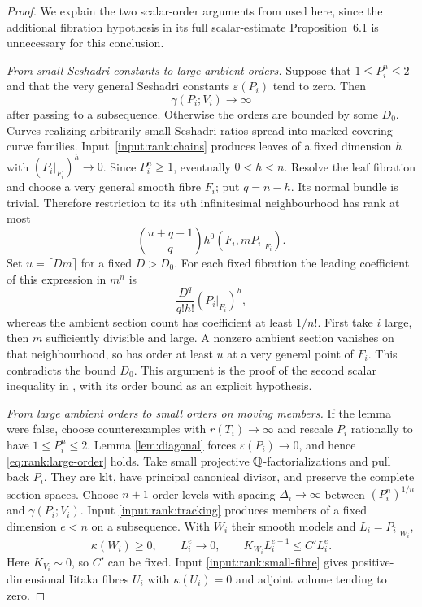 \begin{proof}
We explain the two scalar-order arguments from \cite{UPI} used here,
since the additional fibration hypothesis in its full scalar-estimate
Proposition~6.1 is unnecessary for this conclusion.

\emph{From small Seshadri constants to large ambient orders.}
Suppose that $1\le P_i^n\le2$ and that the very general Seshadri
constants $\varepsilon(P_i)$ tend to zero.  Then
\begin{equation}\label{eq:rank:large-order}
                         \gamma(P_i;V_i)\longrightarrow\infty
\end{equation}
after passing to a subsequence.  Otherwise the orders are bounded by
some $D_0$.  Curves realizing arbitrarily small Seshadri ratios spread
into marked covering curve families.  Input~\ref{input:rank:chains}
produces leaves of a fixed dimension $h$ with $(P_i|_{F_i})^h\to0$.
Since $P_i^n\ge1$, eventually $0<h<n$.  Resolve the leaf fibration and
choose a very general smooth fibre $F_i$; put $q=n-h$.  Its normal
bundle is trivial.  Therefore restriction to its $u$th infinitesimal
neighbourhood has rank at most
\[
                 \binom{u+q-1}{q}h^0(F_i,mP_i|_{F_i}).
\]
Set $u=\lceil Dm\rceil$ for a fixed $D>D_0$.  For each fixed
fibration the leading coefficient of this expression in $m^n$ is
\[
                   \frac{D^q}{q!h!}(P_i|_{F_i})^h,
\]
whereas the ambient section count has coefficient at least $1/n!$.
First take $i$ large, then $m$ sufficiently divisible and large.  A
nonzero ambient section vanishes on that neighbourhood, so has order
at least $u$ at a very general point of $F_i$.  This contradicts the
bound $D_0$.  This argument is the proof of the second scalar inequality
in \cite{UPI}, with its order bound as an explicit hypothesis.

\emph{From large ambient orders to small orders on moving members.}
If the lemma were false, choose counterexamples with $r(T_i)\to\infty$
and rescale $P_i$ rationally to have $1\le P_i^n\le2$.  Lemma
\ref{lem:diagonal} forces $\varepsilon(P_i)\to0$, and hence
\eqref{eq:rank:large-order} holds.  Take small projective
$\mathbb Q$-factorializations and pull back $P_i$.  They are klt, have
principal canonical divisor, and preserve the complete section spaces.
Choose $n+1$ order levels with spacing $\Delta_i\to\infty$ between
$(P_i^n)^{1/n}$ and $\gamma(P_i;V_i)$.  Input
\ref{input:rank:tracking} produces members of a fixed dimension $e<n$
on a subsequence.  With $W_i$ their smooth models and $L_i=P_i|_{W_i}$,
\[
 \kappa(W_i)\ge0,\qquad
 L_i^e\longrightarrow0,\qquad
 K_{W_i}L_i^{e-1}\le C'L_i^e.
\]
Here $K_{V_i}\sim0$, so $C'$ can be fixed.  Input
\ref{input:rank:small-fibre} gives positive-dimensional Iitaka fibres
$U_i$ with $\kappa(U_i)=0$ and adjoint volume tending to zero.


\end{proof}
